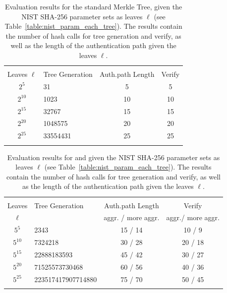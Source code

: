 \begin{table}
\centering
\begin{tabular}{c l c c} 
 \hline\noalign{\smallskip}
 \multicolumn{4}{c}{\textbf{Evaluation Results NIST: Merkle Tree}} \\
 \noalign{\smallskip} 
  Leaves $\ell$ & Tree Generation & Auth.path Length & Verify \\
 \hline\noalign{\smallskip}
 $2^5$ & 31 & 5 & 5 \\
 $2^{10}$ & 1023 & 10 & 10 \\
 $2^{15}$ & 32767 & 15 & 15 \\ 
 $2^{20}$ & 1048575 & 20 & 20 \\ 
 $2^{25}$ & 33554431 & 25 & 25 \\ 
 \hline\noalign{\smallskip}
 \end{tabular}
\caption{Evaluation results for the standard Merkle Tree, given the NIST SHA-256 parameter sets as leaves $\ell$ (see Table~\ref{table:nist_param_each_tree}). The results contain the number of hash calls for tree generation and verify, as well as the length of the authentication path given the leaves $\ell$.}
\label{table:eval_merkle_tree_NIST}
\end{table}

\begin{table}
\centering
\begin{tabular}{c l c c} 
 \hline\noalign{\smallskip}
 \multicolumn{4}{c}{\textbf{Evaluation Results NIST: \tftree\xspace/ \extree}} \\
 \noalign{\smallskip} 
  Leaves & Tree Generation & Auth.path Length & Verify \\
 $\ell$ & & aggr. / more aggr. & aggr./ more aggr. \\
 \hline\noalign{\smallskip}
 $5^5$ & 2343 & 15 / 14 & 10 / 9 \\
 $5^{10}$ & 7324218 & 30 / 28 & 20 / 18 \\
 $5^{15}$ & 22888183593 & 45 / 42 & 30 / 27 \\ 
 $5^{20}$ & 71525573730468 & 60 / 56 & 40 / 36 \\ 
 $5^{25}$ & 223517417907714880 & 75 / 70 & 50 / 45 \\ 
 \hline\noalign{\smallskip}
 \end{tabular}
\caption{Evaluation results for \tftree and \extree given the NIST SHA-256 parameter sets as leaves $\ell$ (see Table~\ref{table:nist_param_each_tree}). The results contain the number of hash calls for tree generation and verify, as well as the length of the authentication path given the leaves $\ell$.}
\label{table:eval_t5_NIST}
\end{table}

